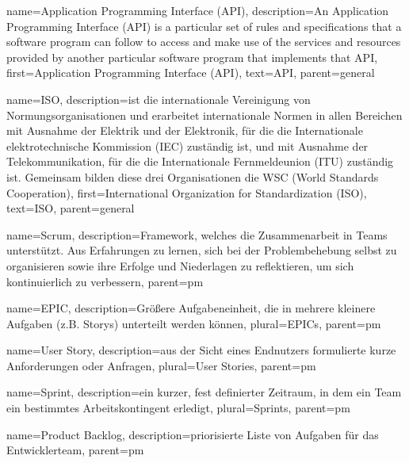 
{
    name={Application Programming Interface (API)},
    description={An Application Programming Interface (API) is a particular set of rules and specifications that a software program can follow to access and make use of the services and resources provided by another particular software program that implements that API},
    first={Application Programming Interface (API)},
    text={API},
    parent=general
}

{
   name={ISO},
   description={ist die internationale Vereinigung von Normungsorganisationen und erarbeitet internationale Normen in allen Bereichen mit Ausnahme der Elektrik und der Elektronik, für die die Internationale elektrotechnische Kommission (IEC) zuständig ist, und mit Ausnahme der Telekommunikation, für die die Internationale Fernmeldeunion (ITU) zuständig ist. Gemeinsam bilden diese drei Organisationen die WSC (World Standards Cooperation)},
   first={International Organization for Standardization (ISO)},
   text={ISO},
   parent=general
} 


{
        name=Scrum,
        description={Framework, welches die Zusammenarbeit in Teams unterstützt. Aus Erfahrungen zu lernen, sich bei der Problembehebung selbst zu organisieren sowie ihre Erfolge und Niederlagen zu reflektieren, um sich kontinuierlich zu verbessern},
        parent=pm
}

{
        name=EPIC,
        description={Größere Aufgabeneinheit, die in mehrere kleinere Aufgaben (z.B. Storys) unterteilt werden können},
        plural={EPICs},
        parent=pm
}

{
        name=User Story,
        description={aus der Sicht eines Endnutzers formulierte kurze Anforderungen oder Anfragen},
        plural={User Stories},
        parent=pm
}

{
        name=Sprint,
        description={ein kurzer, fest definierter Zeitraum, in dem ein Team ein bestimmtes Arbeitskontingent erledigt},
        plural={Sprints},
        parent=pm
}

{
        name=Product Backlog,
        description={priorisierte Liste von Aufgaben für das Entwicklerteam},
        parent=pm
}

